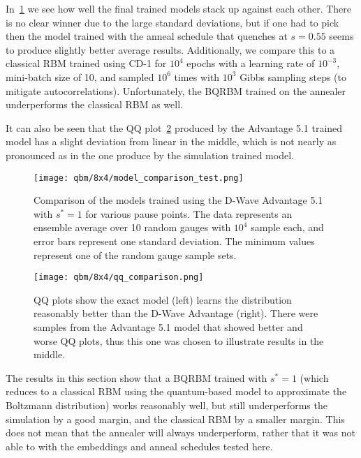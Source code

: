 In~\cref{fig:model_comparison_test} we see how well the final trained models stack up against each other.
There is no clear winner due to the large standard deviations, but if one had to pick then the model trained with the anneal schedule that quenches at \( s = 0.55 \) seems to produce slightly better average results.
Additionally, we compare this to a classical RBM trained using CD-1 for \( 10^4 \) epochs with a learning rate of \( 10^{-3} \), mini-batch size of 10, and sampled \( 10^6 \) times with \( 10^3 \) Gibbs sampling steps (to mitigate autocorrelations).
Unfortunately, the BQRBM trained on the annealer underperforms the classical RBM as well.

It can also be seen that the QQ plot~\cref{fig:qq_comparison} produced by the Advantage 5.1 trained model has a slight deviation from linear in the middle, which is not nearly as pronounced as in the one produce by the simulation trained model.
\begin{figure}[!htb]
    \begin{center}
        \texttt{[image: qbm/8x4/model\_comparison\_test.png]}
    \end{center}
    \caption{Comparison of the models trained using the D-Wave Advantage 5.1 with \( s^* = 1 \) for various pause points. The data represents an ensemble average over 10 random gauges with \( 10^4 \) sample each, and error bars represent one standard deviation. The minimum values represent one of the random gauge sample sets.}
    \label{fig:model_comparison_test}
\end{figure}
\begin{figure}[!htb]
    \begin{center}
        \texttt{[image: qbm/8x4/qq\_comparison.png]}
    \end{center}
    \caption{QQ plots show the exact model (left) learns the distribution reasonably better than the D-Wave Advantage (right). There were samples from the Advantage 5.1 model that showed better and worse QQ plots, thus this one was chosen to illustrate results in the middle.}
    \label{fig:qq_comparison}
\end{figure}

The results in this section show that a BQRBM trained with \( s^* = 1 \) (which reduces to a classical RBM using the quantum-based model to approximate the Boltzmann distribution) works reasonably well, but still underperforms the simulation by a good margin, and the classical RBM by a smaller margin.
This does not mean that the annealer will always underperform, rather that it was not able to with the embeddings and anneal schedules tested here.

